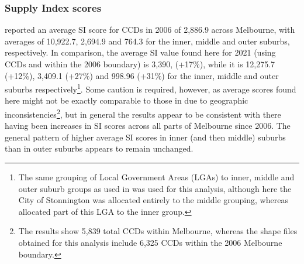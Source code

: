\documentclass[preprint, 3p,
authoryear]{elsarticle} %
\begin{document}
\subsubsection{Supply Index scores}\label{supply-index-scores}

\citet{currie2010identifying} reported an average SI score for CCDs in
2006 of 2,886.9 across Melbourne, with averages of 10,922.7, 2,694.9 and
764.3 for the inner, middle and outer suburbs, respectively. In
comparison, the average SI value found here for 2021 (using CCDs and
within the 2006 boundary) is 3,390, (+17\%), while it is 12,275.7
(+12\%), 3,409.1 (+27\%) and 998.96 (+31\%) for the inner, middle and
outer suburbs respectively\footnote{The same grouping of Local
  Government Areas (LGAs) to inner, middle and outer suburb groups as
  used in \citet{currie2010identifying} was used for this analysis,
  although here the City of Stonnington was allocated entirely to the
  middle grouping, whereas \citet{currie2010identifying} allocated part
  of this LGA to the inner group.}. Some caution is required, however,
as average scores found here might not be exactly comparable to those in
\citet{currie2010identifying} due to geographic
inconsistencies\footnote{The \citet{currie2010identifying} results show
  5,839 total CCDs within Melbourne, whereas the shape files obtained
  for this analysis include 6,325 CCDs within the 2006 Melbourne
  boundary.}, but in general the results appear to be consistent with
there having been increases in SI scores across all parts of Melbourne
since 2006. The general pattern of higher average SI scores in inner
(and then middle) suburbs than in outer suburbs appears to remain
unchanged.
\end{document}
